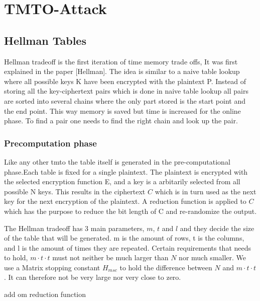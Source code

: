 \chapter{TMTO-Attack}

\label{ch:tmto}

\newpage
\section{Hellman Tables}
\label{sec:hmtheory}
Hellman tradeoff is the first iteration of time memory trade offs, It was first explained in the paper [Hellman].
The idea is similar to a naive table lookup where all possible keys K have been encrypted with the plaintext P.
Instead of storing all the key-ciphertext pairs which is done in naive table lookup all pairs are sorted into several chains where the only part stored is the start point and the end point. This way memory is saved but time is increased for the online phase. To find a pair one needs to find the right chain and look up the pair.


\subsection{Precomputation phase} %
Like any other tmto the table itself is generated in the pre-computational phase.Each table is fixed for a single plaintext. The plaintext is encrypted with the selected encryption function E, and a key is a arbitarily selected from all possible N keys. This results in the ciphertext $C$ which is in turn used as the next key for the next encryption of the plaintext. A reduction function is applied to $C$ which has the purpose to reduce the bit length of C and re-randomize the output.

The Hellman tradeoff has 3 main parameters, $m$, $t$ and $l$ and they decide the size of the table that will be generated.
m is the amount of rows, t is the columns, and l is the amount of times they are repeated.
Certain requirements that needs to hold, $m\cdot t\cdot t$ must not neither be much larger than $N$ nor much smaller. We use a Matrix stopping constant $H_{msc}$ to hold the difference between $N$ and $m\cdot t\cdot t$. It can therefore not be very large nor very close to zero.

add om reduction function


